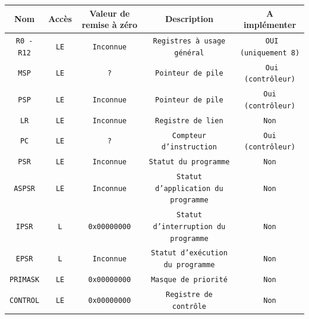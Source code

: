 \documentclass{article}
\begin{document}
    \begin{tabular}{|c|c|c|c|c|}
        \hline
        \textbf{Nom}      & \textbf{Accès} & \textbf{Valeur de remise à zéro} & \textbf{Description} & \textbf{A implémenter}\\
        \hline
        \texttt{R0 - R12} & \texttt{LE}    & \texttt{Inconnue}                & \texttt{Registres à usage général} & \texttt{ OUI (uniquement 8)}\\
        \hline
        \texttt{MSP}      & \texttt{LE}    & \texttt{?}                       & \texttt{Pointeur de pile}                   & \texttt{ Oui (contrôleur)}   \\
        \hline
        \texttt{PSP}      & \texttt{LE}    & \texttt{Inconnue}                & \texttt{Pointeur de pile}                   & \texttt{Oui (contrôleur)}    \\
        \hline
        \texttt{LR}       & \texttt{LE}    & \texttt{Inconnue}                & \texttt{Registre de lien}                   & \texttt{Non}                 \\
        \hline
        \texttt{PC}       & \texttt{LE}    & \texttt{?}                       & \texttt{Compteur d'instruction}             & \texttt{Oui (contrôleur)}    \\
        \hline
        \texttt{PSR}      & \texttt{LE}    & \texttt{Inconnue}                & \texttt{Statut du programme}                & \texttt{Non}                 \\
        \hline
        \texttt{ASPSR}    & \texttt{LE}    & \texttt{Inconnue}                & \texttt{Statut d'application du programme} & \texttt{Non}\\
        \hline
        \texttt{IPSR}     & \texttt{L}     & \texttt{0x00000000}              & \texttt{Statut d'interruption du programme} & \texttt{Non}\\
        \hline
        \texttt{EPSR}     & \texttt{L}     & \texttt{Inconnue}                & \texttt{Statut d'exécution du programme} & \texttt{Non}\\
        \hline
        \texttt{PRIMASK}  & \texttt{LE}    & \texttt{0x00000000}              & \texttt{Masque de priorité}                 & \texttt{Non}                 \\
        \hline
        \texttt{CONTROL}  & \texttt{LE}    & \texttt{0x00000000}              & \texttt{Registre de contrôle}               & \texttt{Non}                 \\
        \hline
    \end{tabular}
\end{document}
